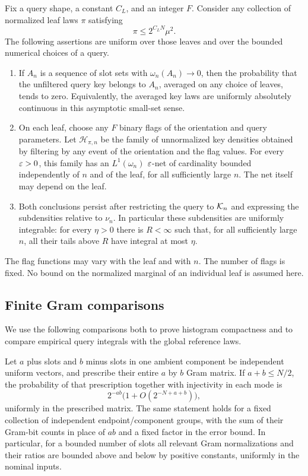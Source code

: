 \begin{lemma}\label{lem:histogram-control}
Fix a query shape, a constant $C_L$, and an integer $F$. Consider any
collection of normalized leaf laws $\pi$ satisfying
\begin{equation}\label{eq:histogram-leaf-cap}
 \pi\le 2^{C_LN}\mu^2.
\end{equation}
The following assertions are uniform over those leaves and over the
bounded numerical choices of a query.
\begin{enumerate}[label=(\roman*)]
\item If $A_n$ is a sequence of slot sets with
$\omega_n(A_n)\to0$, then the probability that the unfiltered query
key belongs to $A_n$, averaged on any choice of leaves, tends to zero.
Equivalently, the averaged key laws are uniformly absolutely continuous
in this asymptotic small-set sense.
\item On each leaf, choose any $F$ binary flags of the orientation and
query parameters. Let $\mathcal H_{\pi,n}$ be the family of
unnormalized key densities obtained by filtering by any event of the
orientation and the flag values. For every $\varepsilon>0$, this family has an
$L^1(\omega_n)$ $\varepsilon$-net of cardinality bounded independently of $n$
and of the leaf, for all sufficiently large $n$. The net itself may
depend on the leaf.
\item Both conclusions persist after restricting the query to $\mathcal K_n$
and expressing the subdensities relative to $\nu_n$. In particular these
subdensities are uniformly integrable: for every $\eta>0$ there is
$R<\infty$ such that, for all sufficiently large $n$, all their tails
above $R$ have integral at most $\eta$.
\end{enumerate}
The flag functions may vary with the leaf and with $n$. The number of
flags is fixed. No bound on the normalized marginal of an individual
leaf is assumed here.
\end{lemma}

\subsection{Finite Gram comparisons}

We use the following comparisons both to prove histogram compactness
and to compare empirical query integrals with the global reference laws.

\begin{lemma}\label{lem:histogram-gram-normalization}
Let $a$ plus slots and $b$ minus slots in one ambient component be
independent uniform vectors, and prescribe their entire $a$ by $b$ Gram
matrix. If $a+b\le N/2$, the probability of that prescription together
with injectivity in each mode is
\[
 2^{-ab}\bigl(1+O(2^{-N+a+b})\bigr),
\]
uniformly in the prescribed matrix. The same statement holds for a
fixed collection of independent endpoint/component groups, with the
sum of their Gram-bit counts in place of $ab$ and a fixed factor in the
error bound. In particular, for a bounded number of slots all relevant
Gram normalizations and their ratios are bounded above and below by
positive constants, uniformly in the nominal inputs.
\end{lemma}

